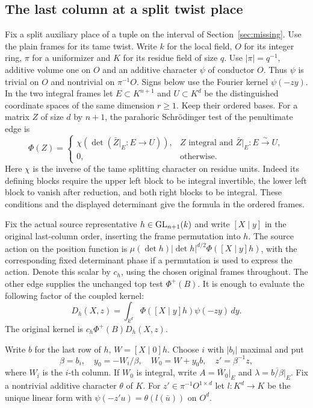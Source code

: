 \documentclass[a4paper,11pt]{article}
\theoremstyle{definition}
\theoremstyle{remark}
\numberwithin{equation}{section}
\begin{document}
\subsection{The last column at a split twist place}\label{nav:VII-67}
Fix a split auxiliary place of a tuple on the interval of
Section~\ref{sec:missing}. Use the plain frames for its tame twist.
Write \(k\) for the local field, \(O\) for its integer ring,
\(\pi\) for a uniformizer and \(K\) for its residue field of
size \(q\). Use \(|\pi|=q^{-1}\), additive volume one on \(O\)
and an additive character \(\psi\) of conductor \(O\). Thus
\(\psi\) is trivial on \(O\) and nontrivial on \(\pi^{-1}O\).
Signs below use the Fourier kernel \(\psi(-zy)\).
In the two integral frames let \(E\subset K^{n+1}\) and
\(U\subset K^d\) be the distinguished coordinate spaces of the
same dimension \(r\ge1\). Keep their ordered bases.
For a matrix \(Z\) of size \(d\) by \(n+1\), the parahoric
Schr\"odinger test of the penultimate edge is
\[
 \Phi(Z)=
 \begin{cases}
 \chi(\det(\bar Z|_E:E\longrightarrow U)),
       & Z\text{ integral and }\bar Z|_E:E\overset{\sim}{\longrightarrow}U,\\
 0, &\text{otherwise}.
 \end{cases}
\]
Here \(\chi\) is the inverse of the tame splitting character
on residue units. Indeed its defining blocks require the
upper left block to be integral invertible, the lower left
block to vanish after reduction, and both right blocks to be
integral. These conditions and the displayed determinant give
the formula in the ordered frames.

Fix the actual source representative \(h\in{\rm GL}_{n+1}(k)\)
and write \([X\mid y]\) in the original last-column order,
inserting the frame permutation into \(h\). The source action
on the position function is
\(\mu(\det h)|\det h|^{d/2}\Phi([X\mid y]h)\), with the
corresponding fixed determinant phase if a permutation is
used to express the action. Denote this scalar by \(c_h\),
using the chosen original frames throughout. The other edge
supplies the unchanged top test \(\Phi^+(B)\). It is enough to
evaluate the following factor of the coupled kernel:
\[
 D_h(X,z)=\int_{k^d}\Phi([X\mid y]h)\psi(-zy)\,dy .
\]
The original kernel is \(c_h\Phi^+(B)D_h(X,z)\).

Write \(b\) for the last row of \(h\), \(W=[X\mid0]h\).
Choose \(i\) with \(|b_i|\) maximal and put
\[
 \beta=b_i,\quad y_0=-W_i/\beta,\quad
 W_0=W+y_0 b,\quad z'=\beta^{-1}z ,
\]
where \(W_i\) is the \(i\)-th column. If \(W_0\) is integral,
write \(A=\bar W_0|_E\) and \(\lambda=\overline{b/\beta}|_E\).
Fix a nontrivial additive character \(\theta\) of \(K\).
For \(z'\in\pi^{-1}O^{1\times d}\) let \(l:K^d\to K\)
be the unique linear form with
\(\psi(-z'u)=\theta(l(\bar u))\) on \(O^d\).
\end{document}

